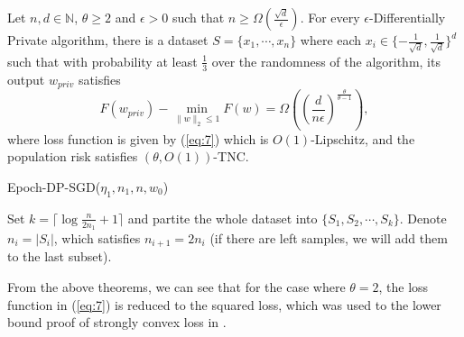 \documentclass[12pt]{alt2022} %
\begin{document}
	
		\begin{theorem}\label{thm:4}
		Let $n,d\in \mathbb{N}$, $\theta\geq 2$ and $\epsilon>0$ such that $n\geq \Omega (\frac{\sqrt{d}}{\epsilon})$. For every $\epsilon$-Differentially Private algorithm, there is a dataset $S=\{x_1, \cdots, x_n\}$ where each $x_i\in \{-\frac{1}{\sqrt{d}}, \frac{1}{\sqrt{d}}\}^d$ such that with probability at least $\frac{1}{3}$ over the randomness of the algorithm, its output $w_{priv}$ satisfies
			\begin{equation*}
		F(w_{priv})-\min_{\|w\|_2\leq 1}F(w) =\Omega\left(     \left(\frac{d}{n\epsilon}\right)^{\frac{\theta}{\theta-1}}
		\right), 
		\end{equation*}
		where loss function  is given by (\ref{eq:7})
		which is $O(1)$-Lipschitz, and the population risk  satisfies $(\theta, O(1))$-TNC. 
	\end{theorem}
		\begin{algorithm}
	\caption{Epoch-DP-SGD($\eta_1,n_1,n,w_0$) \label{alg:5}}
Set $k=\lceil \log \frac{n}{2n_1}+1\rceil$ and partite the whole dataset into $\{S_1,S_2,\cdots,S_k\}$. Denote $n_i=|S_i|$, which satisfies $n_{i+1}=2n_{i}$ (if there are left samples, we will add them to the last subset).\;

\end{algorithm}		
\begin{remark}
From the above theorems, we can see that  for the case where $\theta=2$, the loss function in (\ref{eq:7}) is reduced to the squared loss, which was used to the lower bound proof of strongly convex loss in \citep{bassily2014private}. 
\end{remark}	
	
\end{document}
